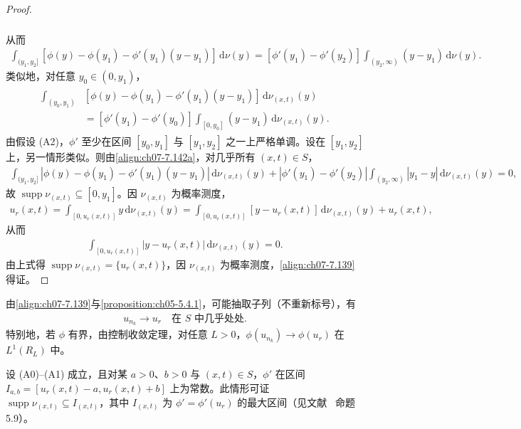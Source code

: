 \documentclass[../../main.tex]{subfiles}%
\begin{document}
\begin{proof}
\begin{align*}
\begin{aligned}
\end{aligned}
\end{align*}
从而
\begin{align}
\int_{(y_1,y_2]}[\phi(y)-\phi(y_1)-\phi'(y_1)(y-y_1)]\,\mathrm{d}\nu(y)
=[\phi'(y_1)-\phi'(y_2)]\int_{(y_2,\infty)}(y-y_1)\,\mathrm{d}\nu(y). \label{align:ch07-7.142a}
\end{align}
类似地，对任意 $y_0\in(0,y_1)$，
\begin{align}
\begin{aligned}
\int_{(y_0,y_1)}&[\phi(y)-\phi(y_1)-\phi'(y_1)(y-y_1)]\,\mathrm{d}\nu_{(x,t)}(y)\\
&=[\phi'(y_1)-\phi'(y_0)]\int_{[0,y_0]}(y-y_1)\,\mathrm{d}\nu_{(x,t)}(y).
\end{aligned} \label{align:ch07-7.142b}
\end{align}
由假设 (A2)，$\phi'$ 至少在区间 $[y_0,y_1]$ 与 $[y_1,y_2]$ 之一上严格单调。设在 $[y_1,y_2]$ 上，另一情形类似。则由\eqref{align:ch07-7.142a}，对几乎所有 $(x,t)\in S$，
\begin{align*}
\int_{(y_1,y_2]}|\phi(y)-\phi(y_1)-\phi'(y_1)(y-y_1)|\,\mathrm{d}\nu_{(x,t)}(y)
+|\phi'(y_1)-\phi'(y_2)|\int_{(y_2,\infty)}|y_1-y|\,\mathrm{d}\nu_{(x,t)}(y)=0,
\end{align*}
故 $\operatorname{supp}\nu_{(x,t)}\subseteq[0,y_1]$。因 $\nu_{(x,t)}$ 为概率测度，
\begin{align*}
u_r(x,t)=\int_{[0,u_r(x,t)]}y\,\mathrm{d}\nu_{(x,t)}(y)
=\int_{[0,u_r(x,t)]}[y-u_r(x,t)]\,\mathrm{d}\nu_{(x,t)}(y)+u_r(x,t),
\end{align*}
从而
\begin{align*}
\int_{[0,u_r(x,t)]}|y-u_r(x,t)|\,\mathrm{d}\nu_{(x,t)}(y)=0.
\end{align*}
由上式得 $\operatorname{supp}\nu_{(x,t)}=\{u_r(x,t)\}$，因 $\nu_{(x,t)}$ 为概率测度，\eqref{align:ch07-7.139}得证。
\end{proof}

\begin{remark}\label{remark:ch07-7.5.2}
由\eqref{align:ch07-7.139}与\cref{proposition:ch05-5.4.1}，可能抽取子列（不重新标号），有
\begin{align}
u_{n_k}\to u_r\quad\text{在 }S\text{ 中几乎处处}. \label{align:ch07-7.143}
\end{align}
特别地，若 $\phi$ 有界，由控制收敛定理，对任意 $L>0$，$\phi(u_{n_k})\to\phi(u_r)$ 在 $L^1(R_L)$ 中。
\end{remark}

\begin{remark}\label{remark:ch07-7.5.3}
设 (A0)--(A1) 成立，且对某 $a>0$、$b>0$ 与 $(x,t)\in S$，$\phi'$ 在区间 $I_{a,b}=[u_r(x,t)-a,u_r(x,t)+b]$ 上为常数。此情形可证 $\operatorname{supp}\nu_{(x,t)}\subseteq I_{(x,t)}$，其中 $I_{(x,t)}$ 为 $\phi'=\phi'(u_r)$ 的最大区间（见文献~\cite{ref18} 命题 5.9）。
\end{remark}
\end{document}
